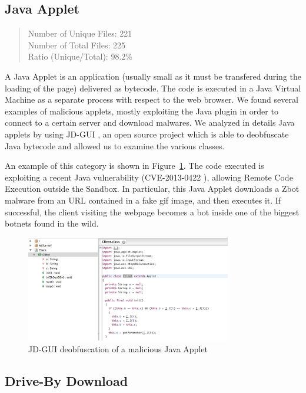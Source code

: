 \subsection{Java Applet}

\begin{quote}
Number of Unique Files: 221\\
Number of Total Files: 225\\
Ratio (Unique/Total): 98.2\%
\end{quote}

A Java Applet is an application (usually small as it must be transfered during the loading of the page) delivered as bytecode. The code is executed in a Java Virtual Machine as a separate process with respect to the web browser. We found several examples of malicious applets, mostly exploiting the Java plugin in order to connect to a certain server and download malwares. We analyzed in details Java applets by using JD-GUI \cite{jdgui}, an open source project which is able to deobfuscate Java bytecode and allowed us to examine the various classes.

An example of this category is shown in Figure~\ref{fig:javaApplet}. The code executed is exploiting a recent Java vulnerability (CVE-2013-0422 \cite{cveJava}), allowing Remote Code Execution outside the Sandbox. In particular, this Java Applet downloads a Zbot malware from an URL contained in a fake gif image, and then executes it. If successful, the client visiting the webpage becomes a bot inside one of the biggest botnets found in the wild.

 \begin{figure}[H]
\centerline{\includegraphics[width=0.8\textwidth]{Images/javaApplet.jpg}}
\caption{JD-GUI deobfuscation of a malicious Java Applet\label{fig:javaApplet}}
\end{figure}

\subsection{Drive-By Download}

